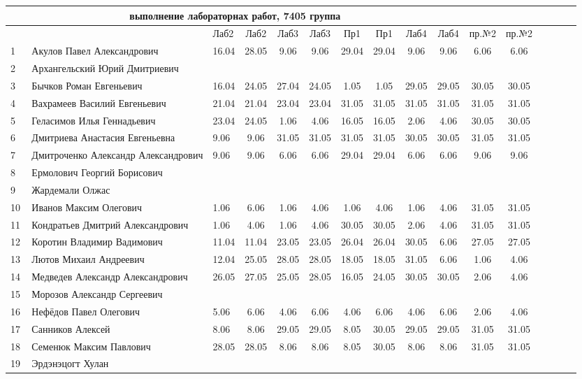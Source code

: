 \documentclass[a4paper,11pt]{article}
\begin{document}
\newpage
{}
\recalctypearea
%
\hspace{-6.4cm} %
\begin{tabular}{l|llccccccccccccc}
\multicolumn{10}{c}{выполнение лабораторнах работ, 7405 группа} \\
\toprule
	                                  &&Лаб2&Лаб2 & Лаб3&Лаб3 & Пр1 &Пр1  & Лаб4 &Лаб4&пр.№2&пр.№2\\
\midrule
1\,&Акулов Павел Александрович            &16.04&28.05& 9.06& 9.06&29.04&29.04& 9.06 & 9.06&6.06& 6.06\\
2\,&Архангельский Юрий Дмитриевич         &     &     &     &     &&&&\\
3\,&Бычков Роман Евгеньевич               &16.04&24.05&27.04&24.05& 1.05& 1.05&29.05 &29.05&30.05&30.05\\
4\,&Вахрамеев Василий Евгеньевич          &21.04&21.04&23.04&23.04&31.05&31.05&31.05 &31.05&31.05&31.05\\
5\,&Геласимов Илья Геннадьевич            &23.04&24.05& 1.06& 4.06&16.05&16.05& 2.06 & 4.06&30.05&30.05\\
\midrule
6\,&Дмитриева Анастасия Евгеньевна        & 9.06& 9.06&31.05&31.05&31.05&31.05&30.05&30.05&31.05&31.05\\
7\,&Дмитроченко Александр Александрович   & 9.06& 9.06& 6.06& 6.06&29.04&29.04& 6.06& 6.06& 9.06& 9.06\\
8\,&Ермолович Георгий Борисович           &     &     &     &     &&&&\\
9\,&Жардемали Олжас                       &     &     &     &     &&&&\\
10\,&Иванов Максим Олегович               & 1.06& 6.06& 1.06& 4.06& 1.06& 4.06& 1.06& 4.06&31.05&31.05\\
\midrule
11\,&Кондратьев Дмитрий Александрович     & 1.06& 4.06& 1.06& 4.06&30.05&30.05& 2.06& 4.06&31.05&31.05\\
12\,&Коротин Владимир Вадимович           &11.04&11.04&23.05&23.05&26.04&26.04&30.05& 6.06&27.05&27.05&\\
13\,&Лютов Михаил Андреевич               &12.04&25.05&28.05&28.05&18.05&18.05&31.05& 6.06& 1.06& 4.06\\
14\,&Медведев Александр Александрович     &26.05&27.05&25.05&28.05&16.05&24.05&30.05&30.05& 2.06& 4.06\\
15\,&Морозов Александр Сергеевич          &&&&&&&&\\
\midrule
16\,&Нефёдов Павел Олегович               & 5.06& 6.06& 4.06& 6.06& 4.06& 6.06& 4.06& 6.06&2.06& 4.06\\
17\,&Санников Алексей                     & 8.06& 8.06&29.05&29.05& 8.05&30.05&29.05&29.05&31.05&31.05\\
18\,&Семенюк Максим Павлович              &28.05&28.05& 8.06& 8.06& 8.05&30.05& 8.06& 8.06&31.05&31.05\\
19\,&Эрдэнэцогт Хулан                     &&&&&&&&\\
\bottomrule
\end{tabular}
\end{document}

